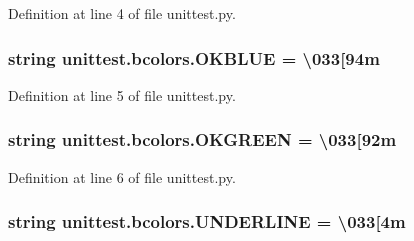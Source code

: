 Definition at line 4 of file unittest.\+py.

\subsubsection[{\texorpdfstring{O\+K\+B\+L\+UE}{OKBLUE}}]{\setlength{\rightskip}{0pt plus 5cm}string unittest.\+bcolors.\+O\+K\+B\+L\+UE = \textquotesingle{}\textbackslash{}033\mbox{[}94m\textquotesingle{}\hspace{0.3cm}{\ttfamily [static]}}\hypertarget{classunittest_1_1bcolors_ac76b755140eefd1ff1eda35552b9ea01}{}\label{classunittest_1_1bcolors_ac76b755140eefd1ff1eda35552b9ea01}


Definition at line 5 of file unittest.\+py.

\subsubsection[{\texorpdfstring{O\+K\+G\+R\+E\+EN}{OKGREEN}}]{\setlength{\rightskip}{0pt plus 5cm}string unittest.\+bcolors.\+O\+K\+G\+R\+E\+EN = \textquotesingle{}\textbackslash{}033\mbox{[}92m\textquotesingle{}\hspace{0.3cm}{\ttfamily [static]}}\hypertarget{classunittest_1_1bcolors_a4ea0a9b856e4906b0423ae6ae4ac16c8}{}\label{classunittest_1_1bcolors_a4ea0a9b856e4906b0423ae6ae4ac16c8}


Definition at line 6 of file unittest.\+py.

\subsubsection[{\texorpdfstring{U\+N\+D\+E\+R\+L\+I\+NE}{UNDERLINE}}]{\setlength{\rightskip}{0pt plus 5cm}string unittest.\+bcolors.\+U\+N\+D\+E\+R\+L\+I\+NE = \textquotesingle{}\textbackslash{}033\mbox{[}4m\textquotesingle{}\hspace{0.3cm}{\ttfamily [static]}}\hypertarget{classunittest_1_1bcolors_ac181b1324b4847e254b738c74ef5fc00}{}\label{classunittest_1_1bcolors_ac181b1324b4847e254b738c74ef5fc00}


